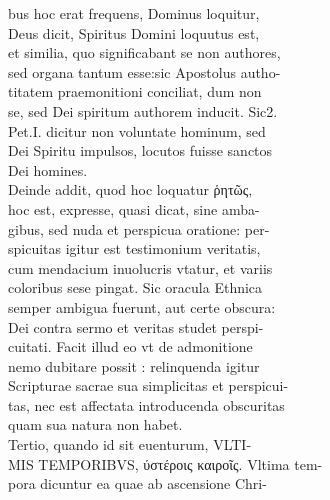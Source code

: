 \documentclass{article}
\begin{document}
\begin{pages}
                bus hoc erat frequens, Dominus loquitur, \\
                Deus dicit, Spiritus Domini loquutus est, \\
                et similia, quo significabant se non authores, \\
                sed organa tantum esse:sic Apostolus autho- \\
                titatem praemonitioni conciliat, dum non \\
                se, sed Dei spiritum authorem inducit. Sic2. \\
                Pet.I. dicitur non voluntate hominum, sed \\
                Dei Spiritu impulsos, locutos fuisse sanctos \\
                Dei homines. \\
                Deinde addit, quod hoc loquatur ῥητῶς, \\
                hoc est, expresse, quasi dicat, sine amba- \\
                gibus, sed nuda et perspicua oratione: per- \\
                spicuitas igitur est testimonium veritatis, \\
                cum mendacium inuolucris vtatur, et variis \\
                coloribus sese pingat. Sic oracula Ethnica \\
                semper ambigua fuerunt, aut certe obscura: \\
                Dei contra sermo et veritas studet perspi- \\
                cuitati. Facit illud eo vt de admonitione \\
                nemo dubitare possit : relinquenda igitur \\
                Scripturae sacrae sua simplicitas et perspicui- \\
                tas, nec est affectata introducenda obscuritas \\
                quam sua natura non habet. \\
                Tertio, quando id sit euenturum, VLTI- \\
                MIS TEMPORIBVS, ύστέροις καιροῖς. Vltima tem- \\
                pora dicuntur ea quae ab ascensione Chri- \\

\end{pages}
\end{document}
